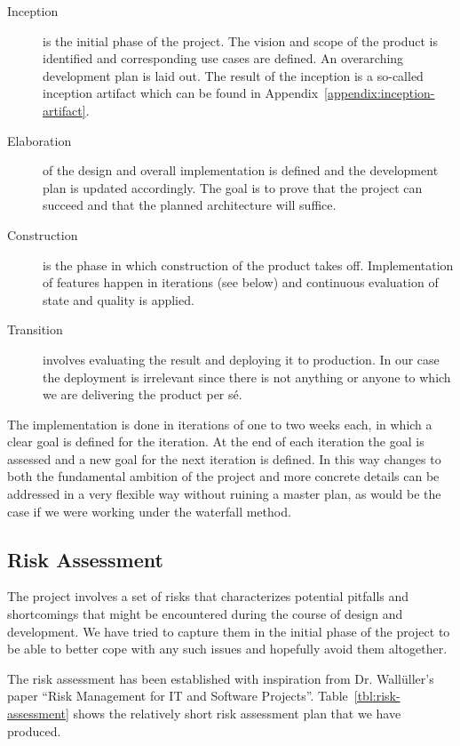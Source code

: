 \begin{description}
\item[Inception] is the initial phase of the project. The vision and scope of
  the product is identified and corresponding use cases are defined. An
  overarching development plan is laid out. The result of the inception is a
  so-called inception artifact which can be found in
  Appendix~\ref{appendix:inception-artifact}.

\item[Elaboration] of the design and overall implementation is defined and the
  development plan is updated accordingly. The goal is to prove that the project
  can succeed and that the planned architecture will suffice.

\item[Construction] is the phase in which construction of the product takes
  off. Implementation of features happen in iterations (see below) and
  continuous evaluation of state and quality is applied.

\item[Transition] involves evaluating the result and deploying it to
  production. In our case the deployment is irrelevant since there is not
  anything or anyone to which we are delivering the product per s\'e.

\end{description}

The implementation is done in iterations of one to two weeks each, in which a
clear goal is defined for the iteration. At the end of each iteration the goal
is assessed and a new goal for the next iteration is defined. In this way
changes to both the fundamental ambition of the project and more concrete
details can be addressed in a very flexible way without ruining a master plan,
as would be the case if we were working under the waterfall method.

\subsection{Risk Assessment}
\label{sec:project-mgmt:risk-assessment}

The project involves a set of risks that characterizes potential pitfalls and
shortcomings that might be encountered during the course of design and
development. We have tried to capture them in the initial phase of the project
to be able to better cope with any such issues and hopefully avoid them
altogether.

The risk assessment has been established with inspiration from Dr. Wall\"uller's
paper ``Risk Management for IT and Software
Projects''\cite{risk-assessment}. Table~\ref{tbl:risk-assessment} shows the
relatively short risk assessment plan that we have produced.

